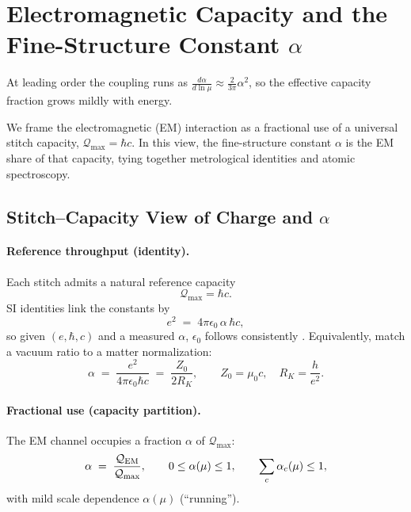 
\section*{Electromagnetic Capacity and the Fine-Structure Constant \texorpdfstring{$\alpha$}{alpha}}

At leading order the coupling runs as $\frac{d\alpha}{d\ln\mu}\approx \frac{2}{3\pi}\alpha^2$, so the effective capacity fraction grows mildly with energy.


We frame the electromagnetic (EM) interaction as a fractional use of a universal stitch capacity,
\(\mathcal Q_{\max}=\hbar c\). In this view, the fine-structure constant \(\alpha\) is the EM share of that capacity,
tying together metrological identities and atomic spectroscopy.

\subsection*{Stitch--Capacity View of Charge and \texorpdfstring{$\alpha$}{alpha}}

\paragraph{Reference throughput (identity).}
Each stitch admits a natural reference capacity
\begin{equation}
\mathcal Q_{\max}=\hbar c.
\end{equation}
SI identities link the constants by
\begin{equation}
e^2 \;=\; 4\pi\epsilon_0\,\alpha\,\hbar c,
\end{equation}
so given \((e,\hbar,c)\) and a measured \(\alpha\), \(\epsilon_0\) follows consistently \cite{bipm2019si,tiesinga2021codata}.
Equivalently, match a vacuum ratio to a matter normalization:
\begin{equation}
\alpha \;=\; \frac{e^2}{4\pi\epsilon_0\hbar c}
\;=\; \frac{Z_0}{2 R_K},
\qquad
Z_0=\mu_0 c,\quad R_K=\frac{h}{e^2}.
\end{equation}

\paragraph{Fractional use (capacity partition).}
The EM channel occupies a fraction \(\alpha\) of \(\mathcal Q_{\max}\):
\begin{equation}
\alpha \;=\; \frac{\mathcal Q_{\rm EM}}{\mathcal Q_{\max}}, \qquad
0\le \alpha(\mu)\le 1,\qquad \sum_c \alpha_c(\mu)\le 1,
\end{equation}
with mild scale dependence \(\alpha(\mu)\) (``running'').

